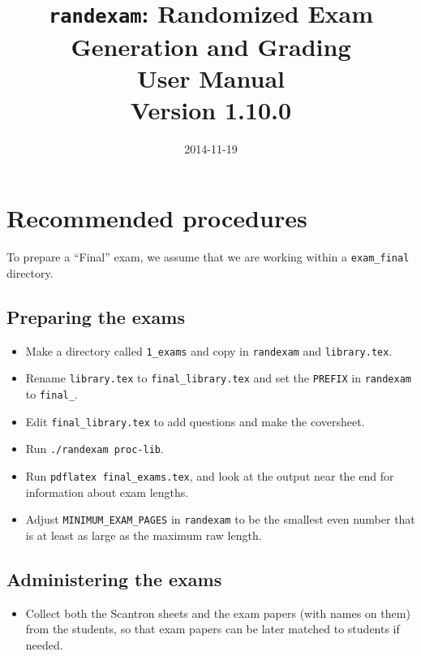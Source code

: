 \documentclass{article}
\begin{document}
\title{\texttt{randexam}: Randomized Exam Generation and Grading\\[1em] User Manual\\[1em] \Large Version 1.10.0}
\date{\vspace*{-2em}2014-11-19}
\maketitle

\section{Recommended procedures}

To prepare a ``Final'' exam, we assume that we are working within a
\texttt{exam_final} directory.

\subsection{Preparing the exams}

\begin{itemize}
\item Make a directory called \texttt{1_exams} and copy in
  \texttt{randexam} and \texttt{library.tex}.
\item Rename \texttt{library.tex} to \texttt{final_library.tex} and
  set the \texttt{PREFIX} in \texttt{randexam} to \texttt{final_}.
\item Edit \texttt{final_library.tex} to add questions and make the
  coversheet.
\item Run \texttt{./randexam proc-lib}.
\item Run \texttt{pdflatex final_exams.tex}, and look at the output
  near the end for information about exam lengths.
\item Adjust \texttt{MINIMUM_EXAM_PAGES} in \texttt{randexam} to be
  the smallest even number that is at least as large as the maximum
  raw length.
\end{itemize}

\subsection{Administering the exams}

\begin{itemize}
\item Collect both the Scantron sheets and the exam papers (with names
  on them) from the students, so that exam papers can be later matched
  to students if needed.
\end{itemize}
\end{document}
